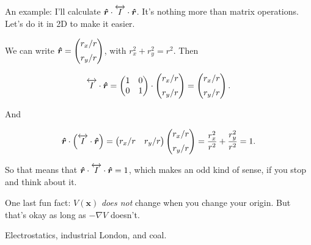 \documentclass{article}
\begin{document}
An example: I'll calculate $\bm{\hat{r}} \cdot \overleftrightarrow{I} \cdot \bm{\hat{r}}$. It's nothing more than matrix operations. Let's do it in 2D to make it easier.

We can write $\displaystyle \bm{\hat{r}} = \begin{pmatrix} r_x/r \\[0.5em] r_y/r \end{pmatrix}$, with $\displaystyle r_x^2 + r_y^2 = r^2$. Then 

\begin{equation*}
    \overleftrightarrow{I}\cdot\bm{\hat{r}} = \begin{pmatrix} 1 & 0 \\ 0 & 1 \end{pmatrix} \cdot \begin{pmatrix} r_x/r \\[0.5em] r_y/r \end{pmatrix} = \begin{pmatrix} r_x/r \\[0.5em] r_y/r \end{pmatrix}.
\end{equation*}

And

\begin{equation*}
    \bm{\hat{r}} \cdot \left( \overleftrightarrow{I} \cdot \bm{\hat{r}} \right) = \begin{pmatrix} r_x/r & r_y/r \end{pmatrix} \begin{pmatrix} r_x/r \\[0.5em] r_y/r \end{pmatrix} = \frac{r_x^2}{r^2} + \frac{r_y^2}{r^2} = 1.
\end{equation*}

So that means that $\bm{\hat{r}} \cdot \overleftrightarrow{I} \cdot \bm{\hat{r}} = 1$, which makes an odd kind of sense, if you stop and think about it.

One last fun fact: $V(\bm{x})$ \emph{does not} change when you change your origin. But that's okay as long as $-\nabla V$ doesn't.

\begin{mdframed}[backgroundcolor=black!4, align=center, userdefinedwidth=0.8\textwidth, topline=false, bottomline = false, leftline = false, rightline = false, frametitle = {Storytime with Pat}]

Electrostatics, industrial London, and coal.

\end{mdframed}

\newpage
\end{document}
